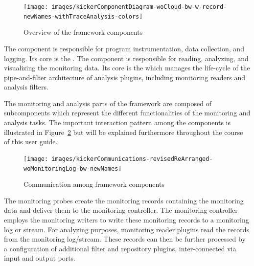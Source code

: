 \begin{figure}[H]\centering
\texttt{[image: images/kickerComponentDiagram-woCloud-bw-w-record-newNames-withTraceAnalysis-colors]}
\caption{Overview of the framework components}
\label{fig:KickerComponentDiagram}
\end{figure}

\noindent The \KickerMonitoringPart{} component is responsible for program instrumentation, data collection, and logging. Its core is the . %
%
The component \KickerAnalysisPart{} is responsible for reading, analyzing, and visualizing the monitoring data. Its core is the  which manages the life-cycle of the pipe-and-filter architecture of analysis plugins, including monitoring readers and  analysis filters.

The monitoring and analysis parts of the \Kicker{} framework are composed of subcomponents which represent the different functionalities of the monitoring and analysis tasks. The important interaction pattern among the components is illustrated in Figure~\ref{fig:KickerCommunicationDiagram} but will be explained furthermore throughout the course of this user guide.

\vspace{1cm}

\begin{figure}[H]\centering
\texttt{[image: images/kickerCommunications-revisedReArranged-woMonitoringLog-bw-newNames]}
\caption{Communication among \Kicker{} framework components}
\label{fig:KickerCommunicationDiagram}
\end{figure}


\noindent The monitoring probes create the monitoring records containing the %
monitoring data and deliver them to the monitoring controller. %
The monitoring controller employs the monitoring writers to write these %
monitoring records to a monitoring log or stream. %
For analyzing purposes, monitoring reader plugins read the records from the %
monitoring log/stream. These records can then be further processed by a %
configuration of additional filter and repository plugins, inter-connected via input and output ports. %

